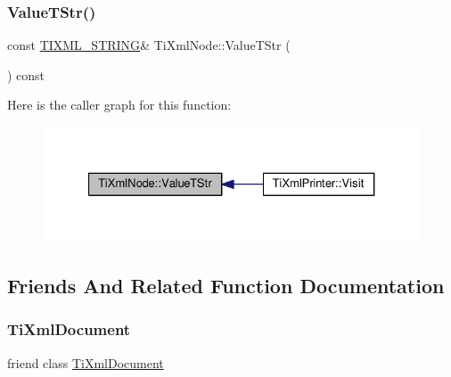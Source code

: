 \subsubsection{\texorpdfstring{Value\+T\+Str()}{ValueTStr()}}
{\footnotesize\ttfamily const \hyperlink{tinyxml_8h_a92bada05fd84d9a0c9a5bbe53de26887}{T\+I\+X\+M\+L\+\_\+\+S\+T\+R\+I\+NG}\& Ti\+Xml\+Node\+::\+Value\+T\+Str (\begin{DoxyParamCaption}{ }\end{DoxyParamCaption}) const\hspace{0.3cm}{\ttfamily [inline]}}

Here is the caller graph for this function\+:\nopagebreak
\begin{figure}[H]
\begin{center}
\leavevmode
\includegraphics[width=327pt]{class_ti_xml_node_a74c4ea4a91c0a91900c919f69f657d6a_icgraph}
\end{center}
\end{figure}


\subsection{Friends And Related Function Documentation}
\mbox{\label{class_ti_xml_node_a173617f6dfe902cf484ce5552b950475}} 
\subsubsection{\texorpdfstring{Ti\+Xml\+Document}{TiXmlDocument}}
{\footnotesize\ttfamily friend class \hyperlink{class_ti_xml_document}{Ti\+Xml\+Document}\hspace{0.3cm}{\ttfamily [friend]}}

\mbox{\label{class_ti_xml_node_ab6592e32cb9132be517cc12a70564c4b}} 
